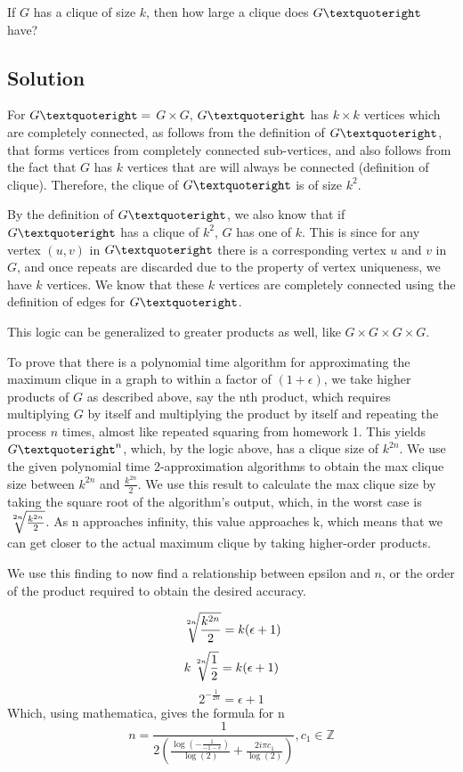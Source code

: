 \documentclass[11pt]{article}
\begin{document}
If $G$ has a clique of size $k$, then how large a clique does $G\textquoteright$ have?

\subsection{Solution}
For $G\textquoteright = $ $G \times G$, $G\textquoteright$ has $k \times k$ vertices which are completely connected, as follows from the definition of $G\textquoteright$, that forms vertices from completely connected sub-vertices, and also follows from the fact that $G$ has $k$ vertices that are will always be connected (definition of clique). Therefore, the clique of $G\textquoteright$ is of size $k^2$.

By the definition of $G\textquoteright$, we also know that if $G\textquoteright$ has a clique of $k^2$, $G$ has one of $k$. This is since for any vertex $(u, v)$ in $G\textquoteright$ there is a corresponding vertex $u$ and $v$ in $G$, and once repeats are discarded due to the property of vertex uniqueness, we have $k$ vertices. We know that these $k$ vertices are completely connected using the definition of edges for $G\textquoteright$.

This logic can be generalized to greater products as well, like $G \times G \times G \times G$.

To prove that there is a polynomial time algorithm for approximating the maximum clique in a graph to within a factor of $(1 + \epsilon)$, we take higher products of $G$ as described above, say the nth product, which requires multiplying $G$ by itself and multiplying the product by itself and repeating the process $n$ times, almost like repeated squaring from homework 1. This yields $G\textquoteright^n$, which, by the logic above, has a clique size of $k^{2n}$. We use the given polynomial time 2-approximation algorithms to obtain the max clique size between $k^{2n}$ and $\frac{k^{2n}}{2}$. We use this result to calculate the max clique size by taking the square root of the algorithm's output, which, in the worst case is $\sqrt[\leftroot{-3}\uproot{3}2n]{\frac{k^{2n}}{2}}$. As n approaches infinity, this value approaches k, which means that we can get closer to the actual maximum clique by taking higher-order products. 

We use this finding to now find a relationship between epsilon and $n$, or the order of the product required to obtain the desired accuracy.

\begin{equation*}
	\sqrt[\leftroot{-3}\uproot{3}2n]{\frac{k^{2n}}{2}} = k(\epsilon + 1)
\end{equation*}
\begin{equation*}
	k\sqrt[\leftroot{-3}\uproot{3}2n]{\frac{1}{2}} = k(\epsilon + 1)
\end{equation*}
\begin{equation*}
	2^{-\frac{1}{2n}} = \epsilon + 1
\end{equation*}
Which, using mathematica, gives the formula for n 
\begin{equation*}
	n = \frac{1}{2 \left(\frac{\log \left(-\frac{1}{-1-e}\right)}{\log (2)}+\frac{2 i \pi  c_1}{\log (2)}\right)},c_1\in \mathbb{Z}
\end{equation*}
\end{document}
